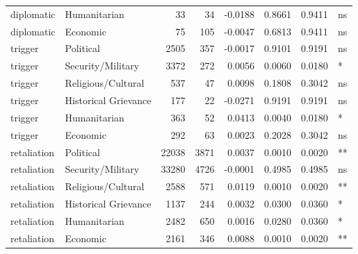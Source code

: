 \begin{longtable}{llrrrrrl}
diplomatic & Humanitarian & 33 & 34 & -0.0188 & 0.8661 & 0.9411 & ns \\
diplomatic & Economic & 75 & 105 & -0.0047 & 0.6813 & 0.9411 & ns \\
trigger & Political & 2505 & 357 & -0.0017 & 0.9101 & 0.9191 & ns \\
trigger & Security/Military & 3372 & 272 & 0.0056 & 0.0060 & 0.0180 & * \\
trigger & Religious/Cultural & 537 & 47 & 0.0098 & 0.1808 & 0.3042 & ns \\
trigger & Historical Grievance & 177 & 22 & -0.0271 & 0.9191 & 0.9191 & ns \\
trigger & Humanitarian & 363 & 52 & 0.0413 & 0.0040 & 0.0180 & * \\
trigger & Economic & 292 & 63 & 0.0023 & 0.2028 & 0.3042 & ns \\
retaliation & Political & 22038 & 3871 & 0.0037 & 0.0010 & 0.0020 & ** \\
retaliation & Security/Military & 33280 & 4726 & -0.0001 & 0.4985 & 0.4985 & ns \\
retaliation & Religious/Cultural & 2588 & 571 & 0.0119 & 0.0010 & 0.0020 & ** \\
retaliation & Historical Grievance & 1137 & 244 & 0.0032 & 0.0300 & 0.0360 & * \\
retaliation & Humanitarian & 2482 & 650 & 0.0016 & 0.0280 & 0.0360 & * \\
retaliation & Economic & 2161 & 346 & 0.0088 & 0.0010 & 0.0020 & ** \\
\end{longtable}
